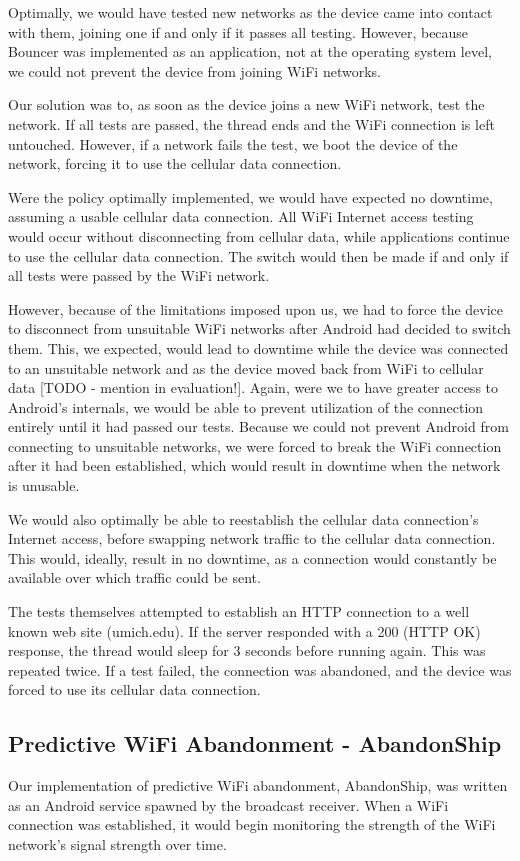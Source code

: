 Optimally, we would have tested new networks as the device came into contact with them, joining one if and only if it passes all testing. However, because Bouncer was implemented as an application, not at the operating system level, we could not prevent the device from joining WiFi networks.

Our solution was to, as soon as the device joins a new WiFi network, test the network. If all tests are passed, the thread ends and the WiFi connection is left untouched. However, if a network fails the test, we boot the device of the network, forcing it to use the cellular data connection.

Were the policy optimally implemented, we would have expected no downtime, assuming a usable cellular data connection. All WiFi Internet access testing would occur without disconnecting from cellular data, while applications continue to use the cellular data connection. The switch would then be made if and only if all tests were passed by the WiFi network.

However, because of the limitations imposed upon us, we had to force the device to disconnect from unsuitable WiFi networks after Android had decided to switch them. This, we expected, would lead to downtime while the device was connected to an unsuitable network and as the device moved back from WiFi to cellular data [TODO - mention in evaluation!]. Again, were we to have greater access to Android's internals, we would be able to prevent utilization of the connection entirely until it had passed our tests. Because we could not prevent Android from connecting to unsuitable networks, we were forced to break the WiFi connection after it had been established, which would result in downtime when the network is unusable.

We would also optimally be able to reestablish the cellular data connection's Internet access, before swapping network traffic to the cellular data connection. This would, ideally, result in no downtime, as a connection would constantly be available over which traffic could be sent.

The tests themselves attempted to establish an HTTP connection to a well known web site (umich.edu). If the server responded with a 200 (HTTP OK) response, the thread would sleep for 3 seconds before running again. This was repeated twice. If a test failed, the connection was abandoned, and the device was forced to use its cellular data connection.

\subsection{Predictive WiFi Abandonment - AbandonShip}
Our implementation of predictive WiFi abandonment, AbandonShip, was written as an Android service spawned by the broadcast receiver. When a WiFi connection was established, it would begin monitoring the strength of the WiFi network's signal strength over time.

